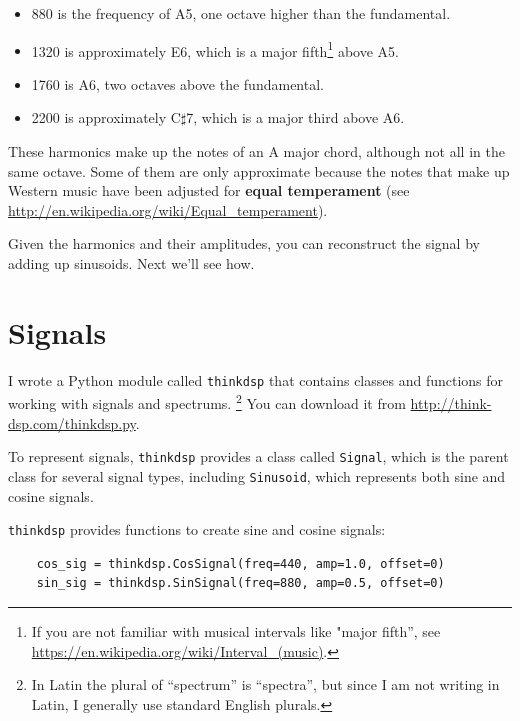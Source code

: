 \documentclass[12pt]{book}
\begin{document}
\begin{itemize}

\item 880 is the frequency of
A5, one octave higher than the fundamental.  

\item 1320 is approximately E6, which is a major fifth\footnote{If you
  are not familiar with musical intervals like "major fifth'', see
  \url{https://en.wikipedia.org/wiki/Interval_(music)}.} above A5.

\item 1760 is A6, two octaves above the fundamental. 

\item 2200 is approximately C$\sharp$7, which is a major third
above A6.

\end{itemize}

These harmonics make up the notes of an A major
chord, although not all in the same octave.  Some of them are only
approximate because the notes that make up Western music have been
adjusted for {\bf equal temperament} (see
 \url{http://en.wikipedia.org/wiki/Equal_temperament}).

Given the harmonics and their amplitudes, you can reconstruct the
signal by adding up sinusoids.  
Next we'll see how.


\section{Signals}

I wrote a Python module called {\tt thinkdsp} that contains
classes and functions for working with signals and spectrums.
\footnote{In Latin the plural of ``spectrum'' is ``spectra'', but 
since I am not writing in Latin, I
generally use standard English plurals.}  You can download
it from \url{http://think-dsp.com/thinkdsp.py}.

To represent signals, {\tt thinkdsp} provides a class called
{\tt Signal}, which is the parent class for several signal types,
including {\tt Sinusoid}, which represents both sine and cosine
signals.

{\tt thinkdsp} provides functions to create sine and cosine signals:

\begin{verbatim}
    cos_sig = thinkdsp.CosSignal(freq=440, amp=1.0, offset=0)
    sin_sig = thinkdsp.SinSignal(freq=880, amp=0.5, offset=0)
\end{verbatim}
\end{document}
